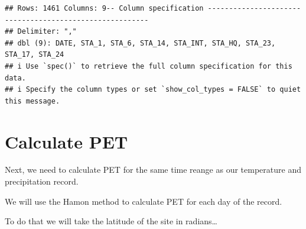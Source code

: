 \documentclass[
]{book}
\newenvironment{Shaded}{\begin{snugshade}}{\end{snugshade}}
\newcommand{\NormalTok}[1]{#1}
\newcommand{\OtherTok}[1]{\textcolor[rgb]{0.56,0.35,0.01}{#1}}
\newcommand{\SpecialCharTok}[1]{\textcolor[rgb]{0.00,0.00,0.00}{#1}}
\begin{document}
\begin{verbatim}
## Rows: 1461 Columns: 9-- Column specification --------------------------------------------------------
## Delimiter: ","
## dbl (9): DATE, STA_1, STA_6, STA_14, STA_INT, STA_HQ, STA_23, STA_17, STA_24
## i Use `spec()` to retrieve the full column specification for this data.
## i Specify the column types or set `show_col_types = FALSE` to quiet this message.
\end{verbatim}

\begin{Shaded}
\end{Shaded}

\hypertarget{calculate-pet}{%
\section{Calculate PET}\label{calculate-pet}}

Next, we need to calculate PET for the same time reange as our temperature and precipitation record.

We will use the Hamon method to calculate PET for each day of the record.

To do that we will take the latitude of the site in radians\ldots{}
\end{document}
